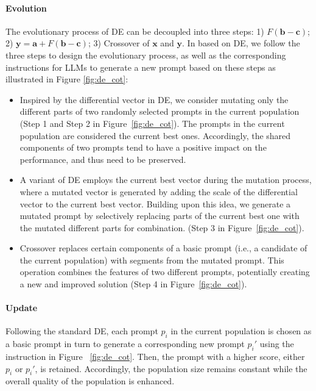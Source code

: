 \paragraph{Evolution} The evolutionary process of DE can be decoupled into three steps: 1) $F(\mathbf{b} - \mathbf{c})$; 2) $\mathbf{y} = \mathbf{a} + F(\mathbf{b} - \mathbf{c})$; 3) Crossover of $\mathbf{x}$ and $\mathbf{y}$. In \modelname based on DE, we follow the three steps to design the evolutionary process, as well as the corresponding instructions for LLMs to generate a new prompt based on these steps as illustrated in Figure \ref{fig:de_cot}:
\begin{itemize}[leftmargin=*]
    \item Inspired by the differential vector in DE, we consider mutating only the different parts of two randomly selected prompts in the current population (Step 1 and Step 2 in Figure~\ref{fig:de_cot}). The prompts in the current population are considered the current best ones. Accordingly, the shared components of two prompts tend to have a positive impact on the performance, and thus need to be preserved.
    \item A variant of DE employs the current best vector during the mutation process, where a mutated vector is generated by adding the scale of the differential vector to the current best vector. Building upon this idea, we generate a mutated prompt by selectively replacing parts of the current best one with the mutated different parts for combination. (Step 3 in Figure~\ref{fig:de_cot}).
    \item Crossover replaces certain components of a basic prompt (i.e., a candidate of the current population) with segments from the mutated prompt. This operation combines the features of two different prompts, potentially creating a new and improved solution (Step 4 in Figure~\ref{fig:de_cot}).
\end{itemize}

\paragraph{Update} Following the standard DE, each prompt $p_i$ in the current population is chosen as a basic prompt in turn to generate a corresponding new prompt $p_i'$ using the instruction in Figure ~\ref{fig:de_cot}. Then, the prompt with a higher score, either $p_i$ or $p_i'$, is retained. Accordingly, the population size remains constant while the overall quality of the population is enhanced.


















